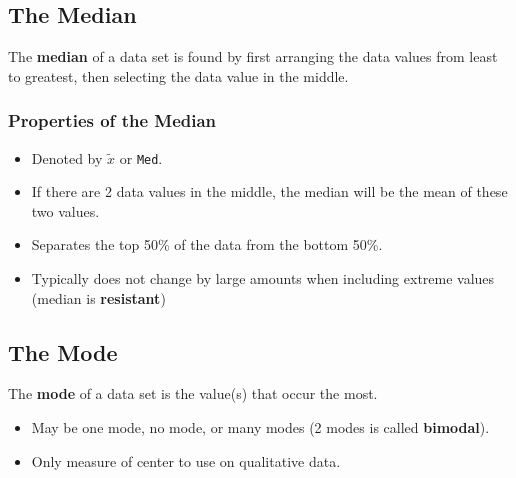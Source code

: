 \documentclass{article}
\begin{document}
\vfill 


\subsection*{The Median}

\begin{tcolorbox}[colframe=green!20!black, colback = green!30!white,title=\textbf{Median}]
The \textbf{median} of a data set is found by first arranging the data values from least to greatest, then selecting the data value in the middle. 
\end{tcolorbox}
\vspace{0.5in}


\subsubsection*{Properties of the Median}
\begin{itemize}
    \item Denoted by $\tilde{x}$ or \texttt{Med}.
    \item If there are 2 data values in the middle, the median will be the mean of these two values.
    \item Separates the top 50\% of the data from the bottom 50\%.
    \item Typically does not change by large amounts when including extreme values (median is \textbf{resistant})
\end{itemize}

\newpage 


\subsection*{The Mode}

\begin{tcolorbox}[colframe=green!20!black, colback = green!30!white,title=\textbf{Mode}]
The \textbf{mode} of a data set is the value(s) that occur the most.
\end{tcolorbox}
\vspace{0.25in}

\begin{itemize}
    \item May be one mode, no mode, or many modes (2 modes is called \textbf{bimodal}).
    \item Only measure of center to use on qualitative data.
\end{itemize}

\vspace{0.75in}
\end{document}

